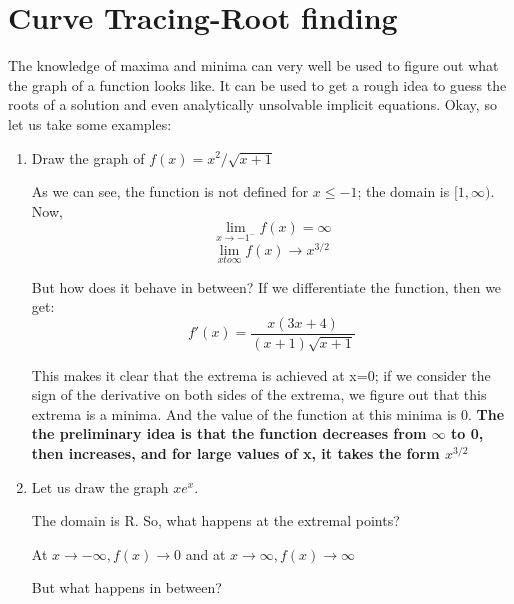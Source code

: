 \section{Curve Tracing-Root finding}

The knowledge of maxima and minima can very well be used to figure out what the graph of a function looks like. It can be used to get a rough idea to guess the roots of a solution and even analytically unsolvable implicit equations. Okay, so let us take some examples:

\begin{enumerate}
    \item Draw the graph of $f(x)=x^2/\sqrt{x+1}$

    As we can see, the function is not defined for $x\leq -1$; the domain is $[1, \infty )$. Now, 
    $$\lim_{x \to -1^{-}} f(x) = \infty$$
    $$\lim_{x to \infty} f(x) \to x^{3/2}$$

    But how does it behave in between?
    If we differentiate the function, then we get:
    $$f'(x) = \frac{x(3x+4)}{(x+1)\sqrt{x+1}}$$

    This makes it clear that the extrema is achieved at x=0; if we consider the sign of the derivative on both sides of the extrema, we figure out that this extrema is a minima. And the value of the function at this minima is 0. \textbf{The the preliminary idea is that the function decreases from $\infty$ to 0, then increases, and for large values of x, it takes the form $x^{3/2}$}


\item Let us draw the graph $xe^x$.

The domain is R. So, what happens at the extremal points?

At $x\to -\infty , f(x) \to 0$ and at $x \to \infty, f(x) \to \infty$

But what happens in between?


\end{enumerate}
